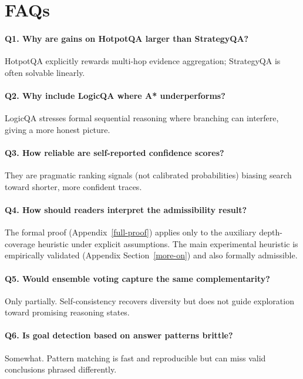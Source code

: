 \documentclass{article}
\begin{document}

\section{FAQs}
\label{app:faqs}

\paragraph{Q1. Why are gains on HotpotQA larger than StrategyQA?}
HotpotQA explicitly rewards multi-hop evidence aggregation; StrategyQA is often solvable linearly.

\paragraph{Q2. Why include LogicQA where A* underperforms?}
LogicQA stresses formal sequential reasoning where branching can interfere, giving a more honest picture.

\paragraph{Q3. How reliable are self-reported confidence scores?}
They are pragmatic ranking signals (not calibrated probabilities) biasing search toward shorter, more confident traces.

\paragraph{Q4. How should readers interpret the admissibility result?}
The formal proof (Appendix~\ref{full-proof}) applies only to the auxiliary depth-coverage heuristic under explicit assumptions. The main experimental heuristic is empirically validated (Appendix Section~\ref{more-on}) and also formally admissible.

\paragraph{Q5. Would ensemble voting capture the same complementarity?}
Only partially. Self-consistency recovers diversity but does not guide exploration toward promising reasoning states.

\paragraph{Q6. Is goal detection based on answer patterns brittle?}
Somewhat. Pattern matching is fast and reproducible but can miss valid conclusions phrased differently.
\end{document}
